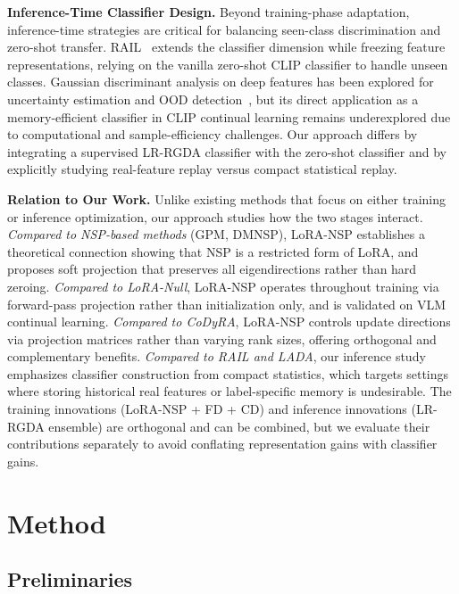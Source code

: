 \documentclass{article}
\begin{document}
\textbf{Inference-Time Classifier Design.}
Beyond training-phase adaptation, inference-time strategies are critical for balancing seen-class discrimination and zero-shot transfer. RAIL~\cite{xu2024rail} extends the classifier dimension while freezing feature representations, relying on the vanilla zero-shot CLIP classifier to handle unseen classes. Gaussian discriminant analysis on deep features has been explored for uncertainty estimation and OOD detection~\cite{lee2018simple}, but its direct application as a memory-efficient classifier in CLIP continual learning remains underexplored due to computational and sample-efficiency challenges. Our approach differs by integrating a supervised LR-RGDA classifier with the zero-shot classifier and by explicitly studying real-feature replay versus compact statistical replay.

\textbf{Relation to Our Work.}
Unlike existing methods that focus on either training or inference optimization, our approach studies how the two stages interact. \textit{Compared to NSP-based methods} (GPM, DMNSP), LoRA-NSP establishes a theoretical connection showing that NSP is a restricted form of LoRA, and proposes soft projection that preserves all eigendirections rather than hard zeroing. \textit{Compared to LoRA-Null}, LoRA-NSP operates throughout training via forward-pass projection rather than initialization only, and is validated on VLM continual learning. \textit{Compared to CoDyRA}, LoRA-NSP controls update directions via projection matrices rather than varying rank sizes, offering orthogonal and complementary benefits. \textit{Compared to RAIL and LADA}, our inference study emphasizes classifier construction from compact statistics, which targets settings where storing historical real features or label-specific memory is undesirable. The training innovations (LoRA-NSP + FD + CD) and inference innovations (LR-RGDA ensemble) are orthogonal and can be combined, but we evaluate their contributions separately to avoid conflating representation gains with classifier gains.

\section{Method}
\label{sec:method}

\subsection{Preliminaries}
\end{document}
